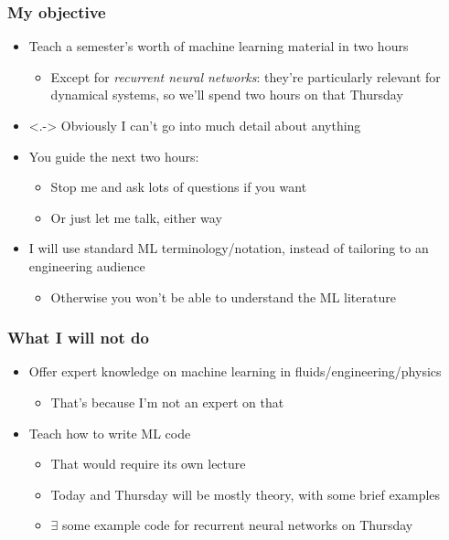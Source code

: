 \begin{frame}
    \frametitle{My objective}

    \begin{itemize}
        \item<+-> Teach a semester's worth of machine learning material in two hours
        \begin{itemize}
            \item Except for \emph{recurrent neural networks}: they're particularly relevant for dynamical systems, so we'll spend two hours on that Thursday
        \end{itemize}
        \item<.-> Obviously I can't go into much detail about anything
        \item<+-> You guide the next two hours:
        \begin{itemize}
            \item Stop me and ask lots of questions if you want \smiley
            \item Or just let me talk, either way
        \end{itemize}
        \item<+-> I will use standard ML terminology/notation, instead of tailoring to an engineering audience
        \begin{itemize}
            \item Otherwise you won't be able to understand the ML literature
        \end{itemize}
    \end{itemize}
\end{frame}

\begin{frame}
    \frametitle{What I will not do}
    \begin{itemize}
        \item<+-> Offer expert knowledge on machine learning in fluids/engineering/physics
        \begin{itemize}
            \item That's because I'm not an expert on that
        \end{itemize}
        \item<+-> Teach how to write ML code
        \begin{itemize}
            \item That would require its own lecture
            \item Today and Thursday will be mostly theory, with some brief examples
            \item $\exists$ some example code for recurrent neural networks on Thursday
        \end{itemize}
    \end{itemize}
\end{frame}


